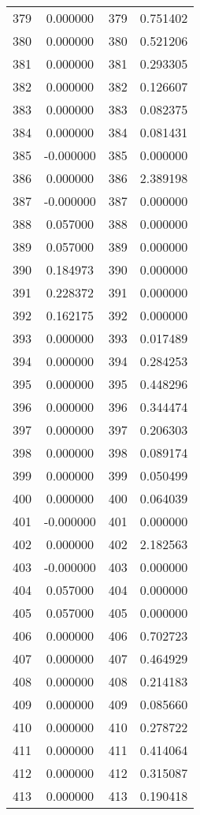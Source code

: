 \documentclass[12pt]{article}
\begin{document}
\begin{longtable}{@{}cccc@{}}
379 & 0.000000 & 379 & 0.751402 \\
380 & 0.000000 & 380 & 0.521206 \\
381 & 0.000000 & 381 & 0.293305 \\
382 & 0.000000 & 382 & 0.126607 \\
383 & 0.000000 & 383 & 0.082375 \\
384 & 0.000000 & 384 & 0.081431 \\
385 & -0.000000 & 385 & 0.000000 \\
386 & 0.000000 & 386 & 2.389198 \\
387 & -0.000000 & 387 & 0.000000 \\
388 & 0.057000 & 388 & 0.000000 \\
389 & 0.057000 & 389 & 0.000000 \\
390 & 0.184973 & 390 & 0.000000 \\
391 & 0.228372 & 391 & 0.000000 \\
392 & 0.162175 & 392 & 0.000000 \\
393 & 0.000000 & 393 & 0.017489 \\
394 & 0.000000 & 394 & 0.284253 \\
395 & 0.000000 & 395 & 0.448296 \\
396 & 0.000000 & 396 & 0.344474 \\
397 & 0.000000 & 397 & 0.206303 \\
398 & 0.000000 & 398 & 0.089174 \\
399 & 0.000000 & 399 & 0.050499 \\
400 & 0.000000 & 400 & 0.064039 \\
401 & -0.000000 & 401 & 0.000000 \\
402 & 0.000000 & 402 & 2.182563 \\
403 & -0.000000 & 403 & 0.000000 \\
404 & 0.057000 & 404 & 0.000000 \\
405 & 0.057000 & 405 & 0.000000 \\
406 & 0.000000 & 406 & 0.702723 \\
407 & 0.000000 & 407 & 0.464929 \\
408 & 0.000000 & 408 & 0.214183 \\
409 & 0.000000 & 409 & 0.085660 \\
410 & 0.000000 & 410 & 0.278722 \\
411 & 0.000000 & 411 & 0.414064 \\
412 & 0.000000 & 412 & 0.315087 \\
413 & 0.000000 & 413 & 0.190418 \\

\end{longtable}
\end{document}
